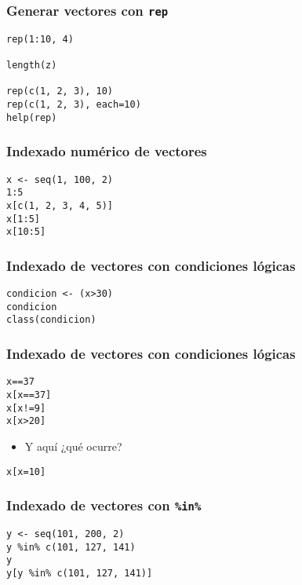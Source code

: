 \documentclass[xcolor={usenames,svgnames,dvipsnames}]{beamer}
\begin{document}
\begin{frame}[fragile]
\frametitle{Generar vectores con \texttt{rep}}
\label{sec-2-1-7}


\lstset{language=R}
\begin{lstlisting}
rep(1:10, 4)

length(z)

rep(c(1, 2, 3), 10)
rep(c(1, 2, 3), each=10)
help(rep)
\end{lstlisting}
\end{frame}
\begin{frame}[fragile]
\frametitle{Indexado numérico de vectores}
\label{sec-2-1-8}



\lstset{language=R}
\begin{lstlisting}
x <- seq(1, 100, 2)
1:5
x[c(1, 2, 3, 4, 5)]
x[1:5]
x[10:5]
\end{lstlisting}
\end{frame}
\begin{frame}[fragile]
\frametitle{Indexado de vectores con condiciones lógicas}
\label{sec-2-1-9}


\lstset{language=R}
\begin{lstlisting}
condicion <- (x>30)
condicion
class(condicion)
\end{lstlisting}
\end{frame}
\begin{frame}[fragile]
\frametitle{Indexado de vectores con condiciones lógicas}
\label{sec-2-1-10}



\lstset{language=R}
\begin{lstlisting}
x==37
x[x==37]
x[x!=9]
x[x>20]
\end{lstlisting}

\begin{itemize}
\item Y aquí ¿qué ocurre?
\end{itemize}

\lstset{language=R}
\begin{lstlisting}
x[x=10]
\end{lstlisting}
     
\end{frame}
\begin{frame}[fragile]
\frametitle{Indexado de vectores con \texttt{\%in\%}}
\label{sec-2-1-11}


\lstset{language=R}
\begin{lstlisting}
y <- seq(101, 200, 2)
y %in% c(101, 127, 141)
y
y[y %in% c(101, 127, 141)]
\end{lstlisting}
\end{frame}
\end{document}
